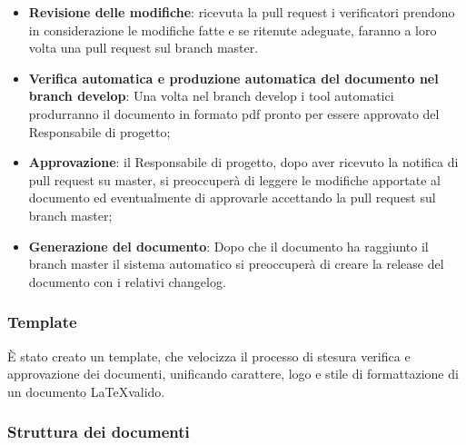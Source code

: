 \begin{itemize}
    \item \textbf{Revisione delle modifiche}: ricevuta la pull request i verificatori
    prendono in considerazione le modifiche fatte e se ritenute adeguate, faranno a
    loro volta una pull request sul branch master.

    \item \textbf{Verifica automatica e produzione automatica del documento nel
    branch develop}: Una volta nel branch develop i tool automatici produrranno il
    documento in formato pdf pronto per essere approvato del Responsabile di progetto;

    \item \textbf{Approvazione}: il Responsabile di progetto, dopo aver ricevuto la notifica
    di pull request su master, si preoccuper\`a di leggere le modifiche apportate al documento
    ed eventualmente di approvarle accettando la pull request sul branch master;

    \item \textbf{Generazione del documento}: Dopo che il documento ha raggiunto il
    branch master il sistema automatico si preoccuper\`a di creare la release del
    documento con i relativi changelog.
  \end{itemize}

  \subsubsection{Template}
  \`E stato creato un template, che velocizza il processo di stesura verifica e
  approvazione dei documenti, unificando carattere, logo e stile di formattazione
  di un documento \LaTeX \space valido.

  \subsubsection{Struttura dei documenti}
